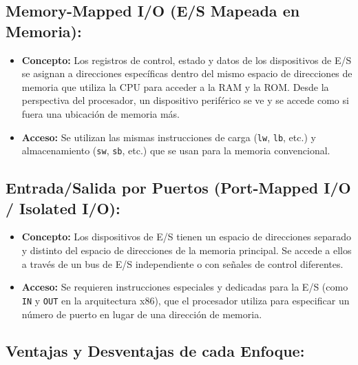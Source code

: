\documentclass[12pt, a4paper]{article}
\begin{document}
\subsection*{Memory-Mapped I/O (E/S Mapeada en Memoria):}
\begin{itemize}
    \item \textbf{Concepto:} Los registros de control, estado y datos de los dispositivos de E/S se asignan a direcciones específicas dentro del mismo espacio de direcciones de memoria que utiliza la CPU para acceder a la RAM y la ROM. Desde la perspectiva del procesador, un dispositivo periférico se ve y se accede como si fuera una ubicación de memoria más.
    \item \textbf{Acceso:} Se utilizan las mismas instrucciones de carga (\texttt{lw}, \texttt{lb}, etc.) y almacenamiento (\texttt{sw}, \texttt{sb}, etc.) que se usan para la memoria convencional.
\end{itemize}

\subsection*{Entrada/Salida por Puertos (Port-Mapped I/O / Isolated I/O):}
\begin{itemize}
    \item \textbf{Concepto:} Los dispositivos de E/S tienen un espacio de direcciones separado y distinto del espacio de direcciones de la memoria principal. Se accede a ellos a través de un bus de E/S independiente o con señales de control diferentes.
    \item \textbf{Acceso:} Se requieren instrucciones especiales y dedicadas para la E/S (como \texttt{IN} y \texttt{OUT} en la arquitectura x86), que el procesador utiliza para especificar un número de puerto en lugar de una dirección de memoria.
\end{itemize}

\subsection*{Ventajas y Desventajas de cada Enfoque:}
\end{document}
